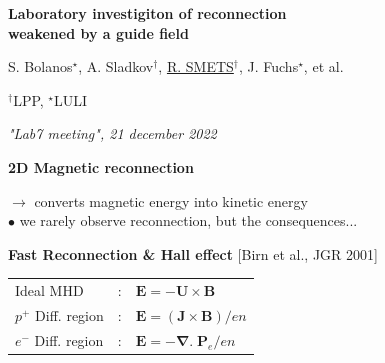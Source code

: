 \documentclass[landscape]{slides}
\begin{document}
\begin{slide}
\thispagestyle{empty}

\begin{center}
\textbf{\Large Laboratory investigiton of reconnection \\[0.4cm] weakened by a guide field}

\vspace{3.0cm}

\textrm{\large S. Bolanos$^{\star}$, A. Sladkov$^{\dagger}$, \underline{R. SMETS}$^{\dagger}$, J. Fuchs$^{\star}$, et al.}
\end{center}

\vspace{1.0cm}

$^{\dagger}$LPP, $^{\star}$LULI

\vspace{2.0cm}

\textit{\large "Lab7 meeting", 21 december 2022}

\end{slide}

\begin{slide}
\large{\textbf{2D Magnetic reconnection}}



$\rightarrow$ converts magnetic energy into kinetic energy \\[0.0cm]
$\bullet$ we rarely observe reconnection, but the consequences...

\end{slide}

\begin{slide}
\large{\textbf{Fast Reconnection \& Hall effect} [Birn et al., JGR 2001]}



\begin{tabular}{lcl}
Ideal MHD & : & $\mathbf E = - \mathbf U \times \mathbf B$ \\[0.4cm]
$p^+$ Diff. region & : & $\mathbf E = (\mathbf J \times \mathbf B) / en$ \\[0.4cm]
$e^-$ Diff. region & : & $\mathbf E = - \boldsymbol{\nabla} . \; \mathbf P_e / en$
\end{tabular}

\end{slide}
\end{document}
